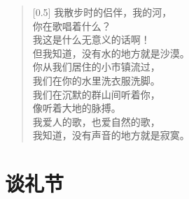 \documentclass[12pt,UTF-8,openany]{ctexbook}
\begin{document}
\begin{normalsize}
    
    \begin{verse}[0.5\linewidth]
        我散步时的侣伴，我的河， \\
        你在歌唱着什么？ \\
        我这是什么无意义的话啊！ \\
        但我知道，没有水的地方就是沙漠。 \\
        你从我们居住的小市镇流过， \\
        我们在你的水里洗衣服洗脚。 \\
        我们在沉默的群山间听着你， \\
        像听着大地的脉搏。 \\
        我爱人的歌，也爱自然的歌， \\
        我知道，没有声音的地方就是寂寞。
    \end{verse}
    
\end{normalsize}



\chapter{谈礼节}
\end{document}
